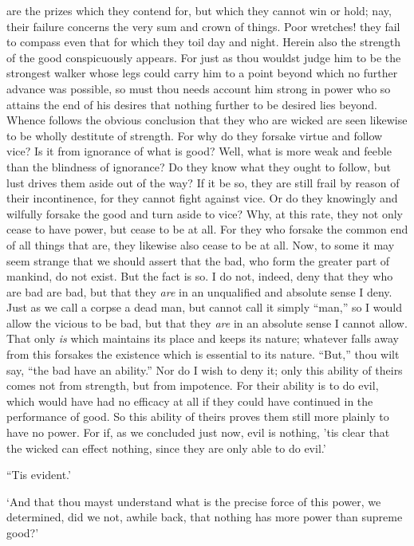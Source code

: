 \documentclass[11pt]{book}
\begin{document}
are the prizes which they contend for, but which they cannot
win or hold; nay, their failure concerns the very sum and crown of
things. Poor wretches! they fail to compass even that for which they
toil day and night. Herein also the strength of the good conspicuously
appears. For just as thou wouldst judge him to be the strongest walker
whose legs could carry him to a point beyond which no further advance
was possible, so must thou needs account him strong in power who so
attains the end of his desires that nothing further to be desired lies
beyond. Whence follows the obvious conclusion that they who are wicked
are seen likewise to be wholly destitute of strength. For why do they
forsake virtue and follow vice? Is it from ignorance of what is good?
Well, what is more weak and feeble than the blindness of ignorance? Do
they know what they ought to follow, but lust drives them aside out of
the way? If it be so, they are still frail by reason of their
incontinence, for they cannot fight against vice. Or do they knowingly
and wilfully forsake the good and turn aside to vice? Why, at this rate,
they not only cease to have power, but cease to be at all. For they who
forsake the common end of all things that are, they likewise also cease
to be at all. Now, to some it may seem strange that we should assert
that the bad, who form the greater part of mankind, do not exist. But
the fact is so. I do not, indeed, deny that they who are bad are bad,
but that they \emph{are} in an unqualified and absolute sense I deny. Just as
we call a corpse a dead man, but cannot call it simply ``man,'' so I would
allow the vicious to be bad, but that they \emph{are} in an absolute sense I
cannot allow. That only \emph{is} which maintains its place and keeps its
nature; whatever falls away from this forsakes the existence which is
essential to its nature. ``But,'' thou wilt say, ``the bad have an
ability.'' Nor do I wish to deny it; only this ability of theirs comes
not from strength, but from impotence. For their ability is to do evil,
which would have had no efficacy at all if they could have continued in
the performance of good. So this ability of theirs proves them still
more plainly to have no power. For if, as we concluded just now, evil is
nothing, 'tis clear that the wicked can effect nothing, since they are
only able to do evil.'

``Tis evident.'

`And that thou mayst understand what is the precise force of this power,
we determined, did we not, awhile back, that nothing has more power than
supreme good?'
\end{document}
